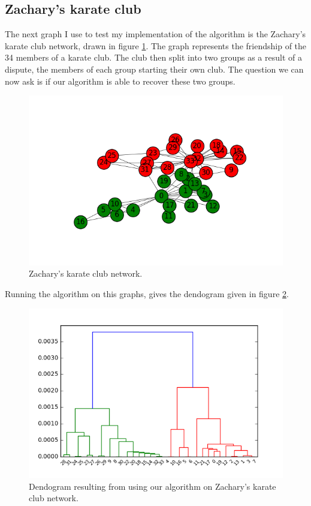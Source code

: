 \documentclass[12pt]{article}
\theoremstyle{definition}
\begin{document}
\subsection{Zachary's karate club \cite{zachary1977information}}
The next graph I use to test my implementation of the algorithm is the Zachary's karate club network, drawn in figure \ref{fig_karate_graph}. The graph represents the friendship of the 34 members of a karate club. The club then split into two groups as a result of a dispute, the members of each group starting their own club. The question we can now ask is if our algorithm is able to recover these two groups.
\begin{figure}[h]
	\includegraphics[scale=0.5]{karate_graph}
	\centering
	\caption{Zachary's karate club network.}
	\label{fig_karate_graph}
\end{figure}
Running the algorithm on this graphs, gives the dendogram given in figure \ref{fig_karate_graph_dendogram}.
\begin{figure}
	\includegraphics[scale=0.5]{karate_dendogram}
	\centering
	\caption{Dendogram resulting from using our algorithm on Zachary's karate club network.}
	\label{fig_karate_graph_dendogram}
\end{figure}
\end{document}
